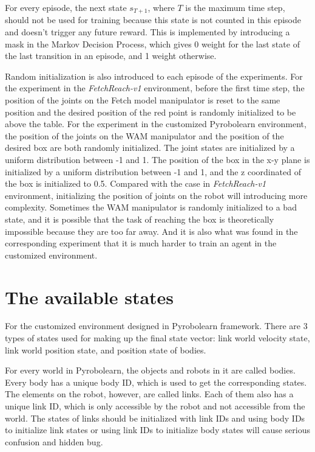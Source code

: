 \documentclass[a4paper, 12pt]{report}
\begin{document}
    For every episode, the next state $s_{T+1}$, where $T$ is the maximum time step, should not be used for training because this state is not counted in this episode and doesn't trigger any future reward. This is implemented by introducing a mask in the Markov Decision Process, which gives 0 weight for the last state of the last transition in an episode, and 1 weight otherwise.

    Random initialization is also introduced to each episode of the experiments. For the experiment in the \emph{FetchReach-v1} environment, before the first time step, the position of the joints on the Fetch model manipulator is reset to the same position and the desired position of the red point is randomly initialized to be above the table. For the experiment in the customized Pyrobolearn environment, the position of the joints on the WAM manipulator and the position of the desired box are both randomly initialized. The joint states are initialized by a uniform distribution between -1 and 1. The position of the box in the x-y plane is initialized by a uniform distribution between -1 and 1, and the z coordinated of the box is initialized to 0.5. Compared with the case in \emph{FetchReach-v1} environment, initializing the position of joints on the robot will introducing more complexity. Sometimes the WAM manipulator is randomly initialized to a bad state, and it is possible that the task of reaching the box is theoretically impossible because they are too far away. And it is also what was found in the corresponding experiment that it is much harder to train an agent in the customized environment.
    
    \section {The available states}

    For the customized environment designed in Pyrobolearn framework. There are 3 types of states used for making up the final state vector: link world velocity state, link world position state, and position state of bodies.

    For every world in Pyrobolearn, the objects and robots in it are called bodies. Every body has a unique body ID, which is used to get the corresponding states. The elements on the robot, however, are called links. Each of them also has a unique link ID, which is only accessible by the robot and not accessible from the world. The states of links should be initialized with link IDs and using body IDs to initialize link states or using link IDs to initialize body states will cause serious confusion and hidden bug.
\end{document}
